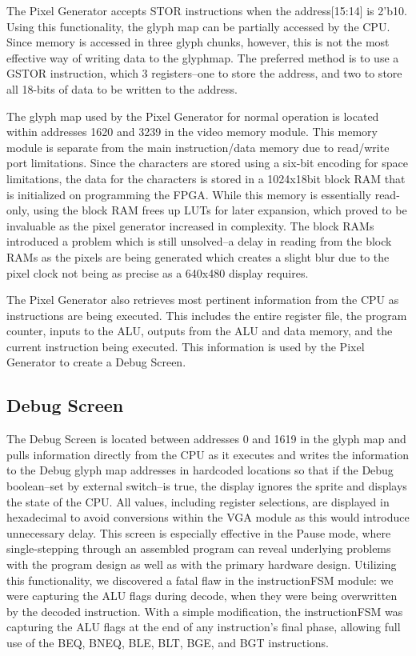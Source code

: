 \documentclass[letterpaper, 11 pt, conference]{article}
\begin{document}
The Pixel Generator accepts STOR instructions when the address[15:14] is 2'b10.  Using this functionality, the glyph map can be partially accessed by the CPU.  Since memory is accessed in three glyph chunks, however, this is not the most effective way of writing data to the glyphmap.  The preferred method is to use a GSTOR instruction, which 3 registers--one to store the address, and two to store all 18-bits of data to be written to the address.

The glyph map used by the Pixel Generator for normal operation is located within addresses 1620 and 3239 in the video memory module.  This memory module is separate from the main instruction/data memory due to read/write port limitations.  Since the characters are stored using a six-bit encoding for space limitations, the data for the characters is stored in a 1024x18bit block RAM that is initialized on programming the FPGA.  While this memory is essentially read-only, using the block RAM frees up LUTs for later expansion, which proved to be invaluable as the pixel generator increased in complexity.  The block RAMs introduced a problem which is still unsolved--a delay in reading from the block RAMs as the pixels are being generated which creates a slight blur due to the pixel clock not being as precise as a 640x480 display requires.

The Pixel Generator also retrieves most pertinent information from the CPU as instructions are being executed.  This includes the entire register file, the program counter, inputs to the ALU, outputs from the ALU and data memory, and the current instruction being executed.  This information is used by the Pixel Generator to create a Debug Screen.

\subsection{Debug Screen}

The Debug Screen is located between addresses 0 and 1619 in the glyph map and pulls information directly from the CPU as it executes and writes the information to the Debug glyph map addresses in hardcoded locations so that if the Debug boolean--set by external switch--is true, the display ignores the sprite and displays the state of the CPU.  All values, including register selections, are displayed in hexadecimal to avoid conversions within the VGA module as this would introduce unnecessary delay.  This screen is especially effective in the Pause mode, where single-stepping through an assembled program can reveal underlying problems with the program design as well as with the primary hardware design.  Utilizing this functionality, we discovered a fatal flaw in the instructionFSM module:  we were capturing the ALU flags during decode, when they were being overwritten by the decoded instruction.  With a simple modification, the instructionFSM was capturing the ALU flags at the end of any instruction's final phase, allowing full use of the BEQ, BNEQ, BLE, BLT, BGE, and BGT instructions.
\end{document}
